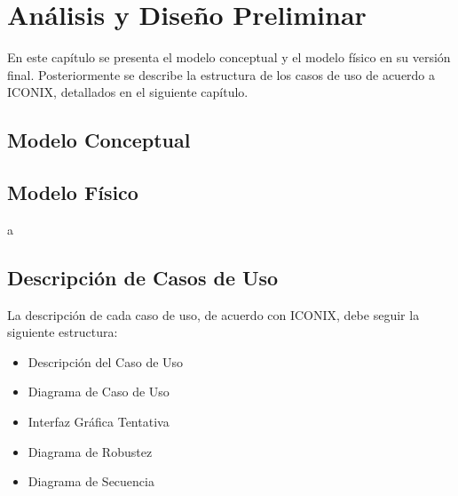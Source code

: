 \chapter{Análisis y Diseño Preliminar}
En este capítulo se presenta el modelo conceptual y el modelo físico en su versión final. Posteriormente se describe la estructura de los casos de uso de acuerdo a ICONIX, detallados en el siguiente capítulo.
\section{Modelo Conceptual}
\section{Modelo Físico}
a
\section{Descripción de Casos de Uso}
La descripción de cada caso de uso, de acuerdo con ICONIX, debe seguir la siguiente estructura: 
\begin{itemize}
    \item Descripción del Caso de Uso
    \item Diagrama de Caso de Uso
    \item Interfaz Gráfica Tentativa
    \item Diagrama de Robustez
    \item Diagrama de Secuencia
\end{itemize}
